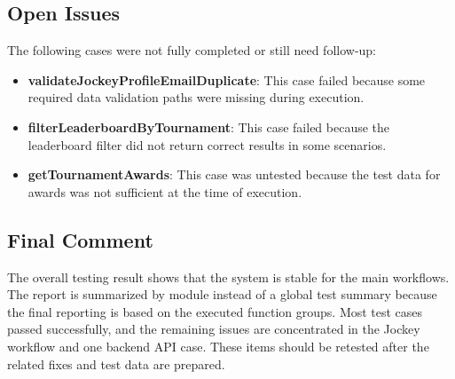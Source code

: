 \subsection{Open Issues}

The following cases were not fully completed or still need follow-up:

\begin{itemize}
    \item \textbf{validateJockeyProfileEmailDuplicate}: This case failed because some required data validation paths were missing during execution.
    \item \textbf{filterLeaderboardByTournament}: This case failed because the leaderboard filter did not return correct results in some scenarios.
    \item \textbf{getTournamentAwards}: This case was untested because the test data for awards was not sufficient at the time of execution.
\end{itemize}

\subsection{Final Comment}

The overall testing result shows that the system is stable for the main workflows. The report is summarized by module instead of a global test summary because the final reporting is based on the executed function groups. Most test cases passed successfully, and the remaining issues are concentrated in the Jockey workflow and one backend API case. These items should be retested after the related fixes and test data are prepared.
